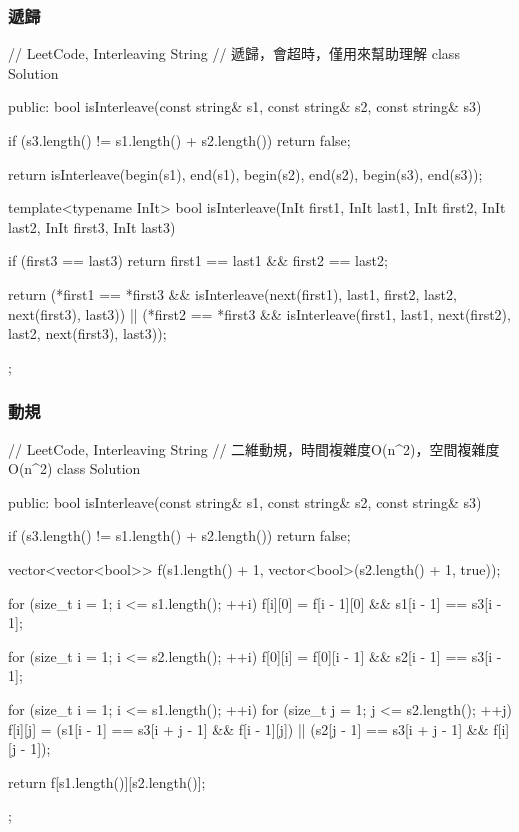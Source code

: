\subsubsection{遞歸}
\begin{Code}
// LeetCode, Interleaving String
// 遞歸，會超時，僅用來幫助理解
class Solution {
public:
    bool isInterleave(const string& s1, const string& s2, const string& s3) {
        if (s3.length() != s1.length() + s2.length())
            return false;

        return isInterleave(begin(s1), end(s1), begin(s2), end(s2),
                begin(s3), end(s3));
    }

    template<typename InIt>
    bool isInterleave(InIt first1, InIt last1, InIt first2, InIt last2,
            InIt first3, InIt last3) {
        if (first3 == last3)
            return first1 == last1 && first2 == last2;

        return (*first1 == *first3
                && isInterleave(next(first1), last1, first2, last2,
                        next(first3), last3))
                || (*first2 == *first3
                        && isInterleave(first1, last1, next(first2), last2,
                                next(first3), last3));
    }
};
\end{Code}


\subsubsection{動規}
\begin{Code}
// LeetCode, Interleaving String
// 二維動規，時間複雜度O(n^2)，空間複雜度O(n^2)
class Solution {
public:
    bool isInterleave(const string& s1, const string& s2, const string& s3) {
        if (s3.length() != s1.length() + s2.length())
            return false;

        vector<vector<bool>> f(s1.length() + 1,
                vector<bool>(s2.length() + 1, true));

        for (size_t i = 1; i <= s1.length(); ++i)
            f[i][0] = f[i - 1][0] && s1[i - 1] == s3[i - 1];

        for (size_t i = 1; i <= s2.length(); ++i)
            f[0][i] = f[0][i - 1] && s2[i - 1] == s3[i - 1];

        for (size_t i = 1; i <= s1.length(); ++i)
            for (size_t j = 1; j <= s2.length(); ++j)
                f[i][j] = (s1[i - 1] == s3[i + j - 1] && f[i - 1][j])
                        || (s2[j - 1] == s3[i + j - 1] && f[i][j - 1]);

        return f[s1.length()][s2.length()];
    }
};
\end{Code}


